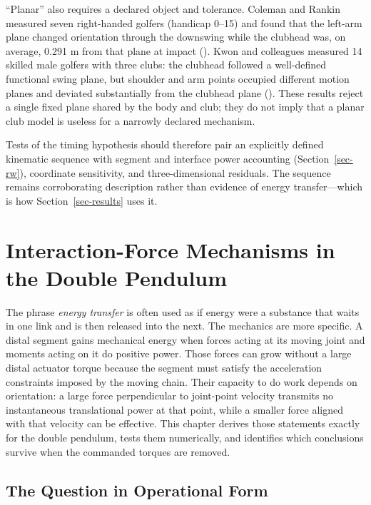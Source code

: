 \documentclass[
  letterpaper,
]{report}
\begin{document}
``Planar'' also requires a declared object and tolerance. Coleman and
Rankin measured seven right-handed golfers (handicap 0--15) and found
that the left-arm plane changed orientation through the downswing while
the clubhead was, on average, 0.291 m from that plane at impact
(). Kwon and
colleagues measured 14 skilled male golfers with three clubs: the
clubhead followed a well-defined functional swing plane, but shoulder
and arm points occupied different motion planes and deviated
substantially from the clubhead plane (). These results reject a single fixed plane shared by the body
and club; they do not imply that a planar club model is useless for a
narrowly declared mechanism.

Tests of the timing hypothesis should therefore pair an explicitly
defined kinematic sequence with segment and interface power accounting
(Section~\ref{sec-rw}), coordinate sensitivity, and three-dimensional
residuals. The sequence remains corroborating description rather than
evidence of energy transfer---which is how Section~\ref{sec-results}
uses it.

\chapter{Interaction-Force Mechanisms in the Double
Pendulum}\label{sec-interaction-forces}

The phrase \emph{energy transfer} is often used as if energy were a
substance that waits in one link and is then released into the next. The
mechanics are more specific. A distal segment gains mechanical energy
when forces acting at its moving joint and moments acting on it do
positive power. Those forces can grow without a large distal actuator
torque because the segment must satisfy the acceleration constraints
imposed by the moving chain. Their capacity to do work depends on
orientation: a large force perpendicular to joint-point velocity
transmits no instantaneous translational power at that point, while a
smaller force aligned with that velocity can be effective. This chapter
derives those statements exactly for the double pendulum, tests them
numerically, and identifies which conclusions survive when the commanded
torques are removed.

\section{The Question in Operational
Form}\label{sec-interaction-question}
\end{document}
